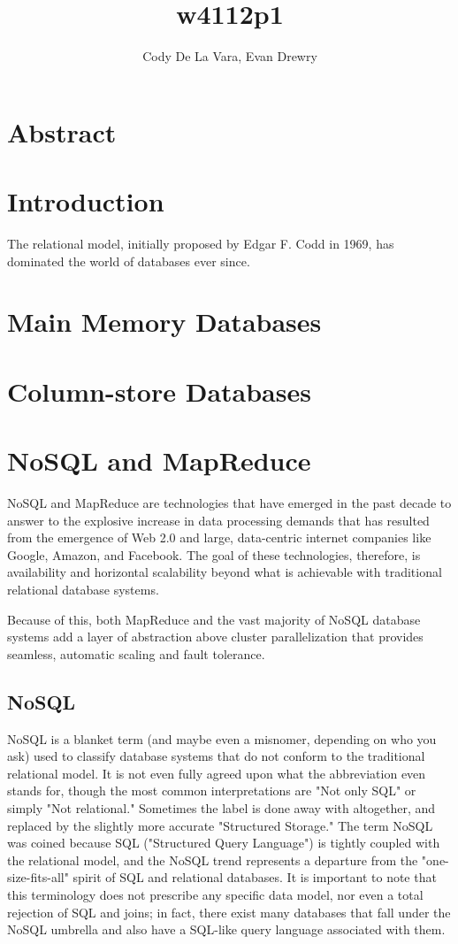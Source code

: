 \documentclass[11pt,a4paper]{report}
\author{Cody De La Vara, Evan Drewry}
\title{w4112p1}
\begin{document}
\maketitle

\section*{Abstract}
\section*{Introduction}
The relational model, initially proposed by Edgar F. Codd in 1969, has dominated the world of databases ever since.\cite{cod70}
\section*{Main Memory Databases}
\section*{Column-store Databases}

\section*{NoSQL and MapReduce}
NoSQL and MapReduce are technologies that have emerged in the past decade to answer to the explosive increase in data processing demands that has resulted from the emergence of Web 2.0 and large, data-centric internet companies like Google, Amazon, and Facebook.\cite{leavitt2010will} The goal of these technologies, therefore, is availability and horizontal scalability beyond what is achievable with traditional relational database systems.

Because of this, both MapReduce and the vast majority of NoSQL database systems add a layer of abstraction above cluster parallelization that provides seamless, automatic scaling and fault tolerance.
\subsection*{NoSQL}
NoSQL is a blanket term (and maybe even a misnomer, depending on who you ask) used to classify database systems that do not conform to the traditional relational model. It is not even fully agreed upon what the abbreviation even stands for, though the most common interpretations are "Not only SQL" or simply "Not relational."\cite{cattell2011scalable} Sometimes the label is done away with altogether, and replaced by the slightly more accurate "Structured Storage." The term NoSQL was coined because SQL ("Structured Query Language") is tightly coupled with the relational model, and the NoSQL trend represents a departure from the "one-size-fits-all" spirit of SQL and relational databases. It is important to note that this terminology does not prescribe any specific data model, nor even a total rejection of SQL and joins; in fact, there exist many databases that fall under the NoSQL umbrella and also have a SQL-like query language associated with them. 
\end{document}

